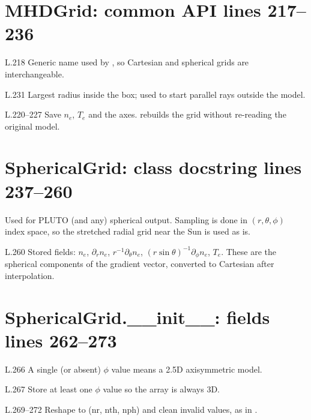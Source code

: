 \section*{\normalsize MHDGrid: common API \hfill{\small\mdseries\color{gray}lines 217--236}}

\begin{lines}
\item[L.218] Generic name used by , so Cartesian and spherical grids are interchangeable.
\item[L.231] Largest radius inside the box; used to start parallel rays outside the model.
\item[L.220–227] Save $n_e$, $T_e$ and the axes.  rebuilds the grid without re-reading the original model.
\end{lines}
\section*{\normalsize SphericalGrid: class docstring \hfill{\small\mdseries\color{gray}lines 237--260}}

Used for PLUTO (and any) spherical output. Sampling is done in $(r,\theta,\phi)$ index space, so the stretched radial grid near the Sun is used as is.

\begin{lines}
\item[L.260] Stored fields: $n_e$, $\partial_r n_e$, $r^{-1}\partial_\theta n_e$, $(r\sin\theta)^{-1}\partial_\phi n_e$, $T_e$. These are the spherical components of the gradient vector, converted to Cartesian after interpolation.
\end{lines}
\section*{\normalsize SphericalGrid.\_\_init\_\_: fields \hfill{\small\mdseries\color{gray}lines 262--273}}

\begin{lines}
\item[L.266] A single (or absent) $\phi$ value means a 2.5D axisymmetric model.
\item[L.267] Store at least one $\phi$ value so the array is always 3D.
\item[L.269–272] Reshape to (nr, nth, nph) and clean invalid values, as in .
\end{lines}
